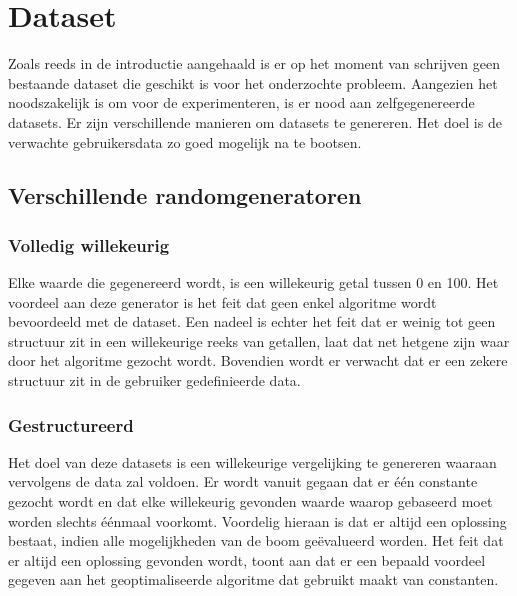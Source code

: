 \documentclass[Main.tex]{subfiles}
\begin{document}
\section{Dataset}

Zoals reeds in de introductie aangehaald is er op het moment van schrijven geen bestaande dataset die geschikt is voor het onderzochte probleem. Aangezien het noodszakelijk is om voor de experimenteren, is er nood aan zelfgegenereerde datasets. Er zijn verschillende manieren om datasets te genereren. Het doel is de verwachte gebruikersdata zo goed mogelijk na te bootsen.
  
\subsection{Verschillende randomgeneratoren}
\subsubsection*{Volledig willekeurig}
Elke waarde die gegenereerd wordt, is een willekeurig getal tussen 0 en 100. Het voordeel aan deze generator is het feit dat geen enkel algoritme wordt bevoordeeld met de dataset. Een nadeel is echter het feit dat er weinig tot geen structuur zit in een willekeurige reeks van getallen, laat dat net hetgene zijn waar door het algoritme gezocht wordt. Bovendien wordt er verwacht dat er een zekere structuur zit in de gebruiker gedefinieerde data.

\subsubsection*{Gestructureerd}
Het doel van deze datasets is een willekeurige vergelijking te genereren waaraan vervolgens de data zal voldoen. Er wordt vanuit gegaan dat er \'e\'en constante gezocht wordt en dat elke willekeurig gevonden waarde waarop gebaseerd moet worden slechts \'e\'enmaal voorkomt. Voordelig hieraan is dat er altijd een oplossing bestaat, indien alle mogelijkheden van de boom ge\"evalueerd worden. Het feit dat er altijd een oplossing gevonden wordt, toont aan dat er een bepaald voordeel gegeven aan het geoptimaliseerde algoritme dat gebruikt maakt van constanten.
\end{document}
